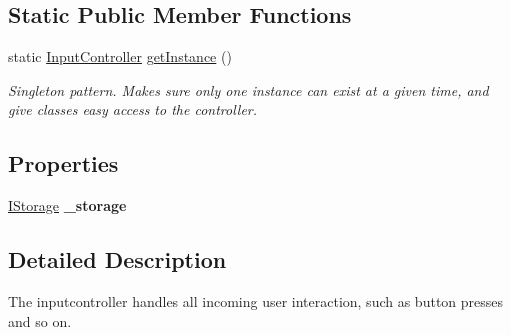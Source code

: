 \subsection*{Static Public Member Functions}
\begin{DoxyCompactItemize}
\item 
static \hyperlink{class_calendar_system_1_1_controller_1_1_input_controller}{Input\+Controller} \hyperlink{class_calendar_system_1_1_controller_1_1_input_controller_ac2ab91bd66d05a5bb762ede338dabc47}{get\+Instance} ()
\begin{DoxyCompactList}\small\item\em Singleton pattern. Makes sure only one instance can exist at a given time, and give classes easy access to the controller. \end{DoxyCompactList}\end{DoxyCompactItemize}
\subsection*{Properties}
\begin{DoxyCompactItemize}
\item 
\hypertarget{class_calendar_system_1_1_controller_1_1_input_controller_a9a599456b056daf9a5b5dc47bc385c78}{\hyperlink{interface_calendar_system_1_1_data_storage_1_1_i_storage}{I\+Storage} {\bfseries \+\_\+storage}}\label{class_calendar_system_1_1_controller_1_1_input_controller_a9a599456b056daf9a5b5dc47bc385c78}

\end{DoxyCompactItemize}


\subsection{Detailed Description}
The inputcontroller handles all incoming user interaction, such as button presses and so on. 



